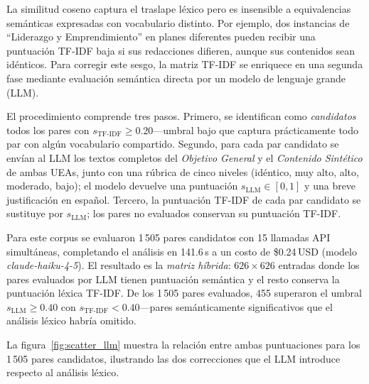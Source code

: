 \documentclass[11pt,a4paper]{article}
\begin{document}
La similitud coseno captura el traslape léxico pero es insensible a equivalencias semánticas expresadas con vocabulario distinto.
Por ejemplo, dos instancias de ``Liderazgo y Emprendimiento'' en planes diferentes pueden recibir una puntuación TF-IDF baja si sus redacciones difieren, aunque sus contenidos sean idénticos.
Para corregir este sesgo, la matriz TF-IDF se enriquece en una segunda fase mediante evaluación semántica directa por un modelo de lenguaje grande (LLM).

El procedimiento comprende tres pasos.
Primero, se identifican como \textit{candidatos} todos los pares con $s_{\mathrm{TF\text{-}IDF}} \geq 0.20$---umbral bajo que captura prácticamente todo par con algún vocabulario compartido.
Segundo, para cada par candidato se envían al LLM los textos completos del \textit{Objetivo General} y el \textit{Contenido Sintético} de ambas UEAs, junto con una rúbrica de cinco niveles (idéntico, muy alto, alto, moderado, bajo); el modelo devuelve una puntuación $s_{\mathrm{LLM}} \in [0,1]$ y una breve justificación en español.
Tercero, la puntuación TF-IDF de cada par candidato se sustituye por $s_{\mathrm{LLM}}$; los pares no evaluados conservan su puntuación TF-IDF.

Para este corpus se evaluaron 1\,505 pares candidatos con 15 llamadas API simultáneas, completando el análisis en 141.6\,s a un costo de \$0.24\,USD (modelo \textit{claude-haiku-4-5}).
El resultado es la \textit{matriz híbrida}: $626 \times 626$ entradas donde los pares evaluados por LLM tienen puntuación semántica y el resto conserva la puntuación léxica TF-IDF.
De los 1\,505 pares evaluados, 455 superaron el umbral $s_{\mathrm{LLM}} \geq 0.40$ con $s_{\mathrm{TF\text{-}IDF}} < 0.40$---pares semánticamente significativos que el análisis léxico habría omitido.

La figura~\ref{fig:scatter_llm} muestra la relación entre ambas puntuaciones para los 1\,505 pares candidatos, ilustrando las dos correcciones que el LLM introduce respecto al análisis léxico.
\end{document}
